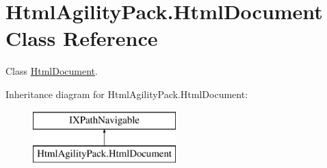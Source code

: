 \hypertarget{class_html_agility_pack_1_1_html_document}{}\section{Html\+Agility\+Pack.\+Html\+Document Class Reference}
\label{class_html_agility_pack_1_1_html_document}


Class \hyperlink{class_html_agility_pack_1_1_html_document}{Html\+Document}.  


Inheritance diagram for Html\+Agility\+Pack.\+Html\+Document\+:\begin{figure}[H]
\begin{center}
\leavevmode
\includegraphics[height=2.000000cm]{class_html_agility_pack_1_1_html_document}
\end{center}
\end{figure}
